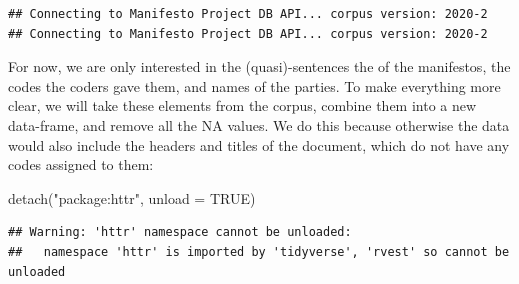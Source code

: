\documentclass[
]{book}
\newenvironment{Shaded}{\begin{snugshade}}{\end{snugshade}}
\newcommand{\AttributeTok}[1]{\textcolor[rgb]{0.77,0.63,0.00}{#1}}
\newcommand{\ConstantTok}[1]{\textcolor[rgb]{0.00,0.00,0.00}{#1}}
\newcommand{\FunctionTok}[1]{\textcolor[rgb]{0.00,0.00,0.00}{#1}}
\newcommand{\NormalTok}[1]{#1}
\newcommand{\StringTok}[1]{\textcolor[rgb]{0.31,0.60,0.02}{#1}}
\begin{document}
\begin{verbatim}
## Connecting to Manifesto Project DB API... corpus version: 2020-2 
## Connecting to Manifesto Project DB API... corpus version: 2020-2
\end{verbatim}

For now, we are only interested in the (quasi)-sentences the of the manifestos, the codes the coders gave them, and names of the parties. To make everything more clear, we will take these elements from the corpus, combine them into a new data-frame, and remove all the NA values. We do this because otherwise the data would also include the headers and titles of the document, which do not have any codes assigned to them:

\begin{Shaded}
\begin{Highlighting}[]
\FunctionTok{detach}\NormalTok{(}\StringTok{"package:httr"}\NormalTok{, }\AttributeTok{unload =} \ConstantTok{TRUE}\NormalTok{)}
\end{Highlighting}
\end{Shaded}

\begin{verbatim}
## Warning: 'httr' namespace cannot be unloaded:
##   namespace 'httr' is imported by 'tidyverse', 'rvest' so cannot be unloaded
\end{verbatim}
\end{document}
